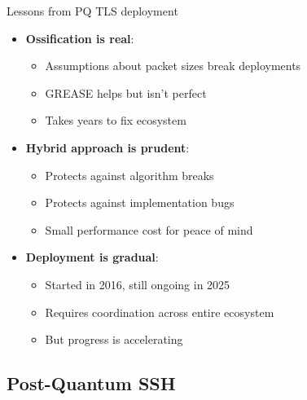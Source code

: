 \documentclass[aspectratio=169, lualatex]{beamer} %
\begin{document}
\begin{frame}{Lessons from PQ TLS deployment}
	\begin{itemize}
		\item \textbf{Ossification is real}:
		      \begin{itemize}
			      \item Assumptions about packet sizes break deployments
			      \item GREASE helps but isn't perfect
			      \item Takes years to fix ecosystem
		      \end{itemize}
		\item \textbf{Hybrid approach is prudent}:
		      \begin{itemize}
			      \item Protects against algorithm breaks
			      \item Protects against implementation bugs
			      \item Small performance cost for peace of mind
		      \end{itemize}
		\item \textbf{Deployment is gradual}:
		      \begin{itemize}
			      \item Started in 2016, still ongoing in 2025
			      \item Requires coordination across entire ecosystem
			      \item But progress is accelerating
		      \end{itemize}
	\end{itemize}
\end{frame}

\fi

\subsection{Post-Quantum SSH}
\end{document}
